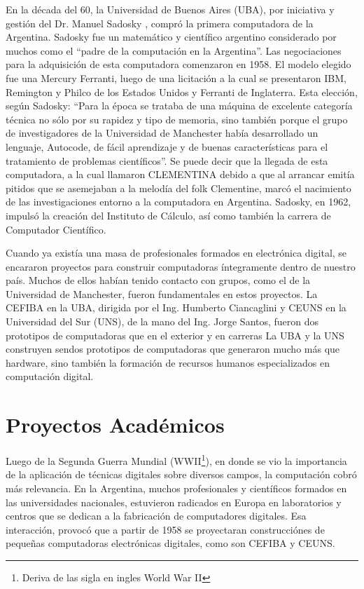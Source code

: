 \documentclass[%
 	final,
%
	notitlepage,
	narroweqnarray,
	inline,
 	twoside,
	]{ieee}
\begin{document}
En la d\'ecada del 60, la Universidad de Buenos Aires (UBA), por iniciativa y gesti\'on del Dr. Manuel Sadosky \cite{sadosky}, compr\'o la primera computadora de la Argentina. Sadosky fue un matem\'atico y cient\'ifico argentino considerado por muchos como el ``padre de la computaci\'on en la Argentina''.
Las negociaciones para la adquisici\'on de esta computadora comenzaron en 1958. El modelo elegido fue una Mercury Ferranti, luego de una licitaci\'on a la cual se presentaron IBM, Remington y Philco de los Estados Unidos y Ferranti de Inglaterra. Esta elecci\'on, seg\'un Sadosky: ``Para la \'epoca se trataba de una m\'aquina de excelente categor\'ia t\'ecnica no s\'olo por su rapidez y tipo de memoria, sino tambi\'en porque el grupo de investigadores de la Universidad de Manchester hab\'ia desarrollado un lenguaje, Autocode, de f\'acil aprendizaje y de buenas caracter\'isticas para el tratamiento de problemas cient\'ificos''.
Se puede decir que la llegada de esta computadora, a la cual llamaron CLEMENTINA  debido a que al arrancar emit\'ia pitidos que se asemejaban a la melod\'ia del folk Clementine, marc\'o el nacimiento de las investigaciones entorno a la computadora en Argentina.
Sadosky, en 1962, impuls\'o la creaci\'on del Instituto de C\'alculo, as\'i como tambi\'en la carrera de Computador Cient\'ifico.

Cuando ya exist\'ia una masa de profesionales formados en electr\'onica digital, se encararon proyectos para construir computadoras \'integramente dentro de nuestro pa\'is. Muchos de ellos hab\'ian tenido contacto con grupos, como el de la Universidad de Manchester, fueron fundamentales en estos proyectos. La CEFIBA en la UBA, dirigida por el Ing. Humberto Ciancaglini y CEUNS en la Universidad del Sur (UNS), de la mano del Ing. Jorge Santos, fueron dos prototipos de computadoras que en el exterior y en carreras La UBA y la UNS construyen sendos prototipos de computadoras que generaron mucho m\'as que hardware, sino tambi\'en la formaci\'on de recursos humanos especializados en computaci\'on digital.

\section{Proyectos Acad\'emicos}
Luego de la Segunda Guerra Mundial (WWII\footnote{Deriva de las sigla en ingles World War II}), en donde se vio la importancia de la aplicaci\'on de t\'ecnicas digitales sobre diversos campos, la computaci\'on cobr\'o m\'as relevancia. En la Argentina, muchos profesionales y cient\'ificos formados en las universidades nacionales, estuvieron radicados en Europa en laboratorios y centros que se dedican a la fabricaci\'on de computadores digitales. Esa interacci\'on, provoc\'o que a partir de 1958 se proyectaran construcci\'ones de peque\~nas computadoras electr\'onicas digitales, como son CEFIBA y CEUNS.
\end{document}
